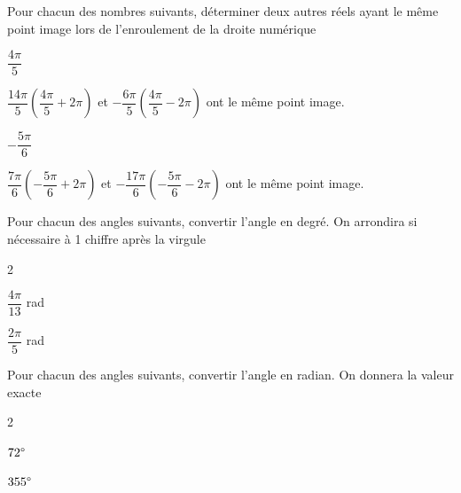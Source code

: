 \documentclass[12pt,a4paper]{article}  %
\begin{document}
Pour chacun des nombres suivants, déterminer deux autres réels ayant le même point image lors de l'enroulement de la droite numérique
\begin{enumMet}
    \item $\dfrac{4\pi}{5}$\quad {}\\
    \begin{corrBox}
        $\dfrac{14\pi}{5} \left(\dfrac{4\pi}{5}+2\pi\right)$ et $-\dfrac{6\pi}{5}\left(\dfrac{4\pi}{5}-2\pi\right)$ ont le même point image.
    \end{corrBox}
    \item $-\dfrac{5\pi}{6}$\quad {}\\
    \begin{corrBox}
        $\dfrac{7\pi}{6} \left(-\dfrac{5\pi}{6}+2\pi\right)$ et $-\dfrac{17\pi}{6}\left(-\dfrac{5\pi}{6}-2\pi\right)$ ont le même point image.
    \end{corrBox}
\end{enumMet}

Pour chacun des angles suivants, convertir l'angle en degré. On arrondira si nécessaire à 1 chiffre après la virgule
\begin{multicols}{2}
\begin{enumMet}
    \item $\dfrac{4\pi}{13}$ rad \quad {} \quad {}
    \item $\dfrac{2\pi}{5}$ rad \quad {} \quad {}
\end{enumMet}
\end{multicols}

Pour chacun des angles suivants, convertir l'angle en radian. On donnera la valeur exacte
\begin{multicols}{2}
\begin{enumMet}
    \item $72\degree$ \quad {} \quad {}
    \item $355\degree$ \quad {} \quad {}
\end{enumMet}
\end{multicols}
\end{document}
